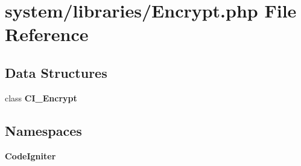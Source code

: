 \section{system/libraries/\-Encrypt.php File Reference}
\label{_encrypt_8php}
\subsection*{Data Structures}
\begin{DoxyCompactItemize}
\item 
class {\bf C\-I\-\_\-\-Encrypt}
\end{DoxyCompactItemize}
\subsection*{Namespaces}
\begin{DoxyCompactItemize}
\item 
{\bf Code\-Igniter}
\end{DoxyCompactItemize}
